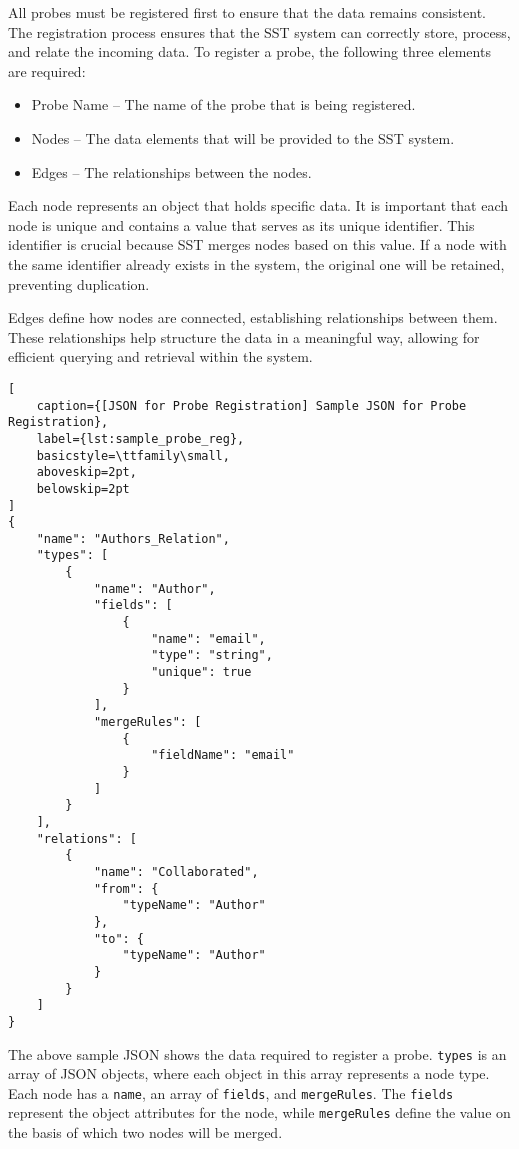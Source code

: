 All probes must be registered first to ensure that the data remains consistent. The registration process ensures that the SST system can correctly store, process, and relate the incoming data. To register a probe, the following three elements are required:

\begin{itemize}
    \item Probe Name – The name of the probe that is being registered.
    \item Nodes – The data elements that will be provided to the SST system.
    \item Edges – The relationships between the nodes.
\end{itemize}

Each node represents an object that holds specific data. It is important that each node is unique and contains a value that serves as its unique identifier. This identifier is crucial because SST merges nodes based on this value. If a node with the same identifier already exists in the system, the original one will be retained, preventing duplication.

Edges define how nodes are connected, establishing relationships between them. These relationships help structure the data in a meaningful way, allowing for efficient querying and retrieval within the system.
\begin{lstlisting}[
    caption={[JSON for Probe Registration] Sample JSON for Probe Registration}, 
    label={lst:sample_probe_reg},
    basicstyle=\ttfamily\small,
    aboveskip=2pt,
    belowskip=2pt
]
{
    "name": "Authors_Relation",
    "types": [
        {
            "name": "Author",
            "fields": [
                {
                    "name": "email",
                    "type": "string",
                    "unique": true
                }
            ],
            "mergeRules": [
                {
                    "fieldName": "email"
                }
            ]
        }
    ],
    "relations": [
        {
            "name": "Collaborated",
            "from": {
                "typeName": "Author"
            },
            "to": {
                "typeName": "Author"
            }
        }
    ]
}
\end{lstlisting}

The above sample JSON shows the data required to register a probe. \texttt{types} is an array of JSON objects, where each object in this array represents a node type. Each node has a \texttt{name}, an array of \texttt{fields}, and \texttt{mergeRules}. The \texttt{fields} represent the object attributes for the node, while \texttt{mergeRules} define the value on the basis of which two nodes will be merged.  

